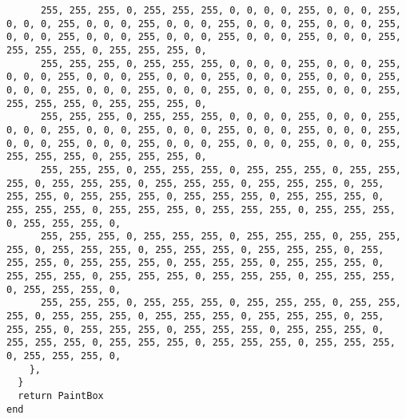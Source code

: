 \documentclass{ctexart}
\begin{document}
\begin{lstlisting}
      255, 255, 255, 0, 255, 255, 255, 0, 0, 0, 0, 255, 0, 0, 0, 255, 0, 0, 0, 255, 0, 0, 0, 255, 0, 0, 0, 255, 0, 0, 0, 255, 0, 0, 0, 255, 0, 0, 0, 255, 0, 0, 0, 255, 0, 0, 0, 255, 0, 0, 0, 255, 0, 0, 0, 255, 255, 255, 255, 0, 255, 255, 255, 0, 
      255, 255, 255, 0, 255, 255, 255, 0, 0, 0, 0, 255, 0, 0, 0, 255, 0, 0, 0, 255, 0, 0, 0, 255, 0, 0, 0, 255, 0, 0, 0, 255, 0, 0, 0, 255, 0, 0, 0, 255, 0, 0, 0, 255, 0, 0, 0, 255, 0, 0, 0, 255, 0, 0, 0, 255, 255, 255, 255, 0, 255, 255, 255, 0, 
      255, 255, 255, 0, 255, 255, 255, 0, 0, 0, 0, 255, 0, 0, 0, 255, 0, 0, 0, 255, 0, 0, 0, 255, 0, 0, 0, 255, 0, 0, 0, 255, 0, 0, 0, 255, 0, 0, 0, 255, 0, 0, 0, 255, 0, 0, 0, 255, 0, 0, 0, 255, 0, 0, 0, 255, 255, 255, 255, 0, 255, 255, 255, 0, 
      255, 255, 255, 0, 255, 255, 255, 0, 255, 255, 255, 0, 255, 255, 255, 0, 255, 255, 255, 0, 255, 255, 255, 0, 255, 255, 255, 0, 255, 255, 255, 0, 255, 255, 255, 0, 255, 255, 255, 0, 255, 255, 255, 0, 255, 255, 255, 0, 255, 255, 255, 0, 255, 255, 255, 0, 255, 255, 255, 0, 255, 255, 255, 0, 
      255, 255, 255, 0, 255, 255, 255, 0, 255, 255, 255, 0, 255, 255, 255, 0, 255, 255, 255, 0, 255, 255, 255, 0, 255, 255, 255, 0, 255, 255, 255, 0, 255, 255, 255, 0, 255, 255, 255, 0, 255, 255, 255, 0, 255, 255, 255, 0, 255, 255, 255, 0, 255, 255, 255, 0, 255, 255, 255, 0, 255, 255, 255, 0, 
      255, 255, 255, 0, 255, 255, 255, 0, 255, 255, 255, 0, 255, 255, 255, 0, 255, 255, 255, 0, 255, 255, 255, 0, 255, 255, 255, 0, 255, 255, 255, 0, 255, 255, 255, 0, 255, 255, 255, 0, 255, 255, 255, 0, 255, 255, 255, 0, 255, 255, 255, 0, 255, 255, 255, 0, 255, 255, 255, 0, 255, 255, 255, 0, 
    },
  }
  return PaintBox
end


\end{lstlisting}
\end{document}
